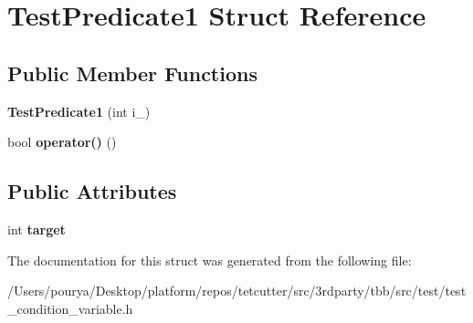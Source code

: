 \hypertarget{structTestPredicate1}{}\section{Test\+Predicate1 Struct Reference}
\label{structTestPredicate1}
\subsection*{Public Member Functions}
\begin{DoxyCompactItemize}
\item 
\hypertarget{structTestPredicate1_a31d484596be15865bb21e6be1e4c7417}{}{\bfseries Test\+Predicate1} (int i\+\_\+)\label{structTestPredicate1_a31d484596be15865bb21e6be1e4c7417}

\item 
\hypertarget{structTestPredicate1_a458671874a000355cb4b64d6cf8a3a5a}{}bool {\bfseries operator()} ()\label{structTestPredicate1_a458671874a000355cb4b64d6cf8a3a5a}

\end{DoxyCompactItemize}
\subsection*{Public Attributes}
\begin{DoxyCompactItemize}
\item 
\hypertarget{structTestPredicate1_ac83b96c4b9c3ebceca3bd2cb989aa8f9}{}int {\bfseries target}\label{structTestPredicate1_ac83b96c4b9c3ebceca3bd2cb989aa8f9}

\end{DoxyCompactItemize}


The documentation for this struct was generated from the following file\+:\begin{DoxyCompactItemize}
\item 
/\+Users/pourya/\+Desktop/platform/repos/tetcutter/src/3rdparty/tbb/src/test/test\+\_\+condition\+\_\+variable.\+h\end{DoxyCompactItemize}
